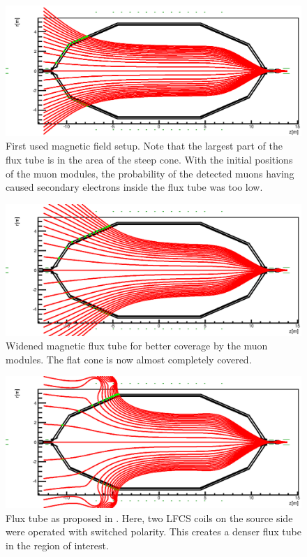   \begin{figure}
	\centerline{\includegraphics[width = 1.1\textwidth]{graphics/analysis/mainSpec/fieldSimulation/fieldlines_100A.eps}}
	\caption[Flux Tube Setting A]{First used magnetic field setup. Note that the largest part of the flux tube is in the area of the steep cone. With the initial positions of the muon modules, the probability of the detected muons having caused secondary electrons inside the flux tube was too low.}
  	\label{fig:mainSpec_100A}
  \end{figure}


  \begin{figure}
	\centerline{\includegraphics[width = 1.1\textwidth]{graphics/analysis/mainSpec/fieldSimulation/fieldlineConfigC.eps}}
	\caption[Flux Tube Setting B]{Widened magnetic flux tube for better coverage by the muon modules. The flat cone is now almost completely covered.}
  	\label{fig:mainSpec_B}
  \end{figure}

  
  \begin{figure}
	\centerline{\includegraphics[width = 1.1\textwidth]{graphics//analysis/mainSpec/fieldSimulation/fieldlines_9.eps}}
	\caption[Flux Tube Setting C]{Flux tube as proposed in \cite{proposalM12}. Here, two LFCS coils on the source side were operated with switched polarity. This creates a denser flux tube in the region of interest.}
  	\label{fig:mainSpec_9}
  \end{figure}

